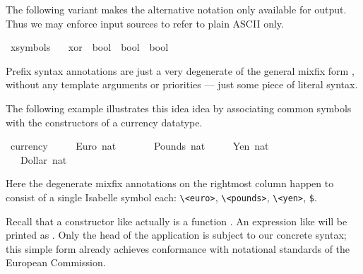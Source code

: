 \begin{isabellebody}
\begin{isamarkuptext}
  \medskip The following variant makes the alternative \isa{{\isasymoplus}}
  notation only available for output.  Thus we may enforce input
  sources to refer to plain ASCII only.%
\end{isamarkuptext}%
\isamarkuptrue%
\ {\isacharparenleft}xsymbols\ \isanewline
\ \ xor\ {\isacharcolon}{\isacharcolon}\ {\isachardoublequote}bool\ {\isasymRightarrow}\ bool\ {\isasymRightarrow}\ bool{\isachardoublequote}\ \ \ \ {\isacharparenleft}\ {\isachardoublequote}{\isasymoplus}{\isasymignore}{\isachardoublequote}\ {}{}{\isacharparenright}\isamarkupfalse%
%
\isamarkuptrue%
%
\begin{isamarkuptext}%
Prefix syntax annotations are just a very
  degenerate of the general mixfix form \cite{isabelle-ref}, without
  any template arguments or priorities --- just some piece of literal
  syntax.

  The following example illustrates this idea idea by associating
  common symbols with the constructors of a currency datatype.%
\end{isamarkuptext}%
\isamarkuptrue%
\ currency\ {\isacharequal}\isanewline
\ \ \ \ Euro\ nat\ \ \ \ {\isacharparenleft}{\isachardoublequote}{\isasymeuro}{\isachardoublequote}{\isacharparenright}\isanewline
\ \ {\isacharbar}\ Pounds\ nat\ \ {\isacharparenleft}{\isachardoublequote}{\isasympounds}{\isachardoublequote}{\isacharparenright}\isanewline
\ \ {\isacharbar}\ Yen\ nat\ \ \ \ \ {\isacharparenleft}{\isachardoublequote}{\isasymyen}{\isachardoublequote}{\isacharparenright}\isanewline
\ \ {\isacharbar}\ Dollar\ nat\ \ {\isacharparenleft}{\isachardoublequote}{\isachardollar}{\isachardoublequote}{\isacharparenright}\isamarkupfalse%
%
\begin{isamarkuptext}%
Here the degenerate mixfix annotations on the rightmost column
  happen to consist of a single Isabelle symbol each:
  \verb,\,\verb,<euro>,, \verb,\,\verb,<pounds>,,
  \verb,\,\verb,<yen>,, \verb,$,.

  Recall that a constructor like  actually is a function
  .  An expression like  will
  be printed as .  Only the head of the application is
  subject to our concrete syntax; this simple form already achieves
  conformance with notational standards of the European Commission.


\end{isamarkuptext}
\end{isabellebody}
